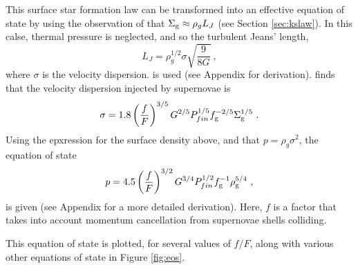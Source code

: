 This surface star formation law can be transformed into an effective equation of state by using the observation of \citet{schaye2004} that $\Sigma_\mathrm{g} \approx \rho_g L_J$ (see Section \ref{sec:kslaw}).
In this calse, thermal pressure is neglected, and so the turbulent Jeans' length,
\begin{equation}
\label{eqn:jeans}
L_J = \rho_g^{1/2} \sigma \sqrt{\frac{9}{8G}}~,
\end{equation}
where $\sigma$ is the velocity dispersion.
is used (see Appendix for derivation).
\citet{martizzi2015} finds that the velocity dispersion injected by supernovae is
\begin{equation}
\label{eqn:martdisp}
\sigma = 1.8 \left(\frac{f}{F}\right)^{{3/5}} G^{{2/5}} P_{fin}^{{1/5}} f_\mathrm{g}^{{-2/5}} \Sigma_\mathrm{g}^{{1/5}}~.
\end{equation}
Using the epxression for the surface density above, and that $p = \rho_g \sigma^2$, the equation of state
\begin{equation}
\label{eqn:eos}
p = 4.5\left(\frac{f}{F}\right)^{{3/2}} G^{{3/4}} P_{fin}^{{1/2}} f_\mathrm{g}^{-1} \rho_\mathrm{g}^{{5/4}}~,
\end{equation}
is given (see Appendix for a more detailed derivation).
Here, $f$ is a factor that takes into account momentum cancellation from supernovae shells colliding.

This equation of state is plotted, for several values of $f/F$, along with various other equations of state in Figure \ref{fig:eos}.

